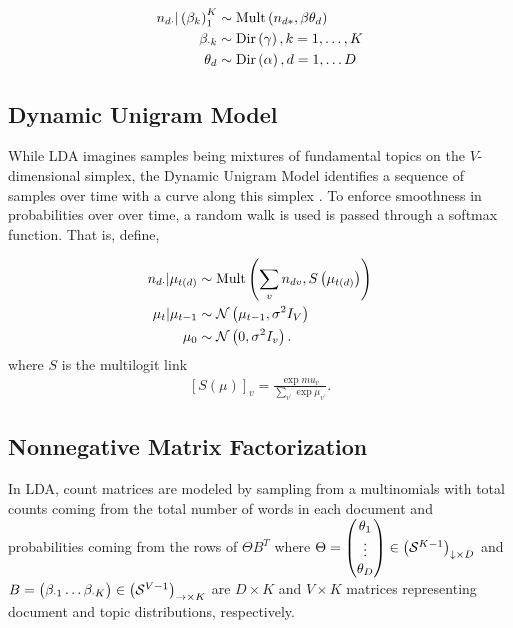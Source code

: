 \documentclass[oupdraft]{bio}
\begin{document}
\begin{align*}
n_{d\cdot} \vert \left(\beta_{k}\right)_{1}^{K} &\sim \textnormal{Mult}\left(n_{d\ast}, \beta \theta_{d}\right) \\
\beta_{\cdot k} &\sim \textnormal{Dir}\left(\gamma\right), k = 1, \dots, K \\
\theta_{d} &\sim \textnormal{Dir}\left(\alpha\right), d = 1, \dots D
\end{align*}

\subsection{Dynamic Unigram Model}

While LDA imagines samples being mixtures of fundamental topics on the
$V$-dimensional simplex, the Dynamic Unigram Model identifies a sequence of
samples over time with a curve along this simplex \citep{blei2006dynamic}. To
enforce smoothness in probabilities over over time, a random walk is used is
passed through a softmax function. That is, define,

\begin{align*}
n_{d\cdot} \vert \mu_{t\left(d\right)}  &\sim \textnormal{Mult}\left(\sum_{v} n_{dv}, S\left(\mu_{t\left(d\right)}\right)\right) \\
\mu_{t} \vert \mu_{t - 1} &\sim \mathcal{N}\left(\mu_{t - 1}, \sigma^{2}I_{V}\right) \\
\mu_{0} &\sim \mathcal{N}\left(0, \sigma^{2}I_{v}\right).
\end{align*}
where $S$ is the multilogit link
\begin{align*}
\left[S\left(\mu\right)\right]_{v} = \frac{\exp{mu_{v}}}{\sum_{v^{\prime}} \exp{\mu_{v^{\prime}}}}.
\end{align*}

\subsection{Nonnegative Matrix Factorization}

In LDA, count matrices are modeled by sampling from a multinomials with total
counts coming from the total number of words in each document and probabilities
coming from the rows of $\Theta B^{T}$ where $\Theta = \begin{pmatrix}\theta_{1}
  \\ \vdots \\ \theta_{D} \end{pmatrix} \in \left(\mathcal{S}^{K -
  1}\right)_{\downarrow \times D}$ and $B = \begin{pmatrix} \beta_{\cdot 1}
  \dots \beta_{\cdot K} \end{pmatrix} \in \left(\mathcal{S}^{V -
  1}\right)_{\rightarrow \times K}$ are $D \times K$ and $V \times K$ matrices
representing document and topic distributions, respectively.
\end{document}

